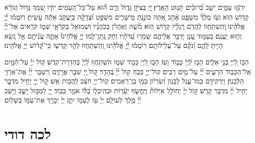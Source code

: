 \documentclass[twoside, openany, parskip=half, 11pt]{book}
\begin{document}
 
 יִרְגְּֿז֣וּ עַמִּ֑ים ישֵׁ֥ב כְּ֝רוּבִ֗ים תָּנ֥וּט הָאָֽרֶץ׃ 
 ֖יְיָ בְּצִיּוֹ֣ן גָּד֑וֹל וְרָ֥ם ה֝֗וּא עַל־כָּל־הָֽעַמִּֽים׃ 
 יוֹד֣וּ שִׁ֭מְךָ גָּד֥וֹל וְנוֹרָ֗א קָד֥וֹשׁ הֽוּא׃ 
 וְעֹ֥ז מֶלֶךְ֘ מִשְׁפָּ֢ט אָ֫הֵ֥ב אַ֭תָּה כּוֹנַ֣נְתָּ מֵּֽישָׁרִ֑ים מִשְׁפָּ֥ט וּ֝צְדָקָ֗ה בְּיַֽעֲקֹ֤ב אַתָּ֬ה עָשִֽׂיתָ׃ 
 רֽוֹמֲמ֡וּ יְ֘יָ֤ אֱלֹהֵ֗ינוּ ֖וְהִֽשְׁתַּֽחֲווּ לַֽהֲדֹ֥ם רַגְלָ֗יו קָד֥וֹשׁ הֽוּא׃ 
 מ֘שֶׁ֤ה וְאַֽהֲרֹ֨ן בְּכֹֽהֲנָ֗יו וּ֭שְׁמוּאֵל בְּקֹֽרְֿאֵ֣י שְׁמ֑וֹ קֹרִ֥אים אֶל־יְ֜יָ֗ וְה֣וּא יַֽעֲנֵֽם׃ 
 בְּעַמּ֣וּד עָ֭נָן יְדַבֵּ֣ר אֲלֵיהֶ֑ם שָֽׁמְֿר֥וּ עֵֽ֝דֹתָ֗יו וְחֹ֣ק נָֽתַן־לָֽמוֹ׃ 
 יְיָ֣ אֱלֹהֵינוּ֘ אַתָּ֢ה עֲנִ֫יתָ֥ם אֵ֣ל נֹ֭שֵֽׂא הָיִ֣יתָ לָהֶ֑ם וְ֝נֹקֵ֗ם עַל־עֲלִֽילוֹתָֽם׃ 
 רֽוֹמֲמ֡וּ יְ֘יָ֤ אֱלֹהֵ֗ינוּ וְ֭הִֽשְׁתַּֽחֲווּ לְהַ֣ר קָדְשׁ֑וֹ כִּֽי־קָ֝ד֗וֹשׁ יְיָ֥ אֱלֹהֵֽינוּ׃

  
 הָב֣וּ לַ֭יְיָ בְּנֵ֣י אֵלִ֑ים הָב֥וּ לַֽ֝יְיָ֗ כָּב֥וֹד וָעֹֽז׃ 
 הָב֣וּ לַ֭יְיָ כְּב֣וֹד שְׁמ֑וֹ הִשְׁתַּֽחֲו֥וּ לַֽ֝יְיָ֗ בְּהַדְרַת־קֹֽדֶשׁ׃ 
 ק֥וֹל יְיָ֗ עַל־הַ֫מָּ֥יִם אֵֽל־הַכָּב֥וֹד הִרְעִ֑ים יְ֜יָ֗ עַל־מַ֥יִם רַבִּֽים׃ 
 קֽוֹל־יְיָ֥ בַּכֹּ֑חַ ק֥וֹל יְ֜יָ֗ בֶּֽהָדָֽר׃ 
 ק֣וֹל ֖יְיָ שֹׁבֵ֣ר אֲרָזִ֑ים וַיְשַׁבֵּ֥ר יְ֜יָ֗ אֶת־אַרְזֵ֥י הַלְּֿבָנֽוֹן׃ 
 וַיַּרְקִידֵ֥ם כְּמוֹ־עֵ֑גֶל לְבָנ֥וֹן וְ֝שִׂרְי֗וֹן כְּמ֣וֹ בֶן־רְאֵמִֽים׃ 
 קֽוֹל־יְיָ֥ חֹצֵ֗ב לַֽהֲב֥וֹת אֵֽשׁ׃ 
 ק֣וֹל יְ֖יָ֥ יָחִ֣יל מִדְבָּ֑ר יָחִ֥יל יְ֜יָ֗ מִדְבַּ֥ר קָדֵֽשׁ׃ 
 ק֣וֹל יְיָ֨ יְחוֹלֵ֣ל אַיָּלוֹת֘ וַיֶּֽחֱשׂ֢ף יְעָ֫ר֥וֹת וּבְהֵֽיכָל֑וֹ כֻּ֝לּ֗וֹ אֹמֵ֥ר כָּבֽוֹד׃ 
 יְ֖יָ לַמַּבּ֣וּל יָשָׁ֑ב וַיֵּ֥שֶׁב יְ֜יָ֗ מֶ֣לֶךְ לְעוֹלָֽם׃ 
יְיָ֗ עֹ֖ז לְעַמּ֣וֹ יִתֵּ֑ן יְיָ֓ יְבָרֵ֖ךְ אֶת־עַמּ֣וֹ בַשָּׁלֽוֹם׃


\section*{ לכה דודי }

\newcommand{\lechadodi}{\textbf{לְכָה דוֹדִי לִקְרַאת כַּלָּה פְּנֵי שַׁבָּת נְקַבְּֿלָה:}}
\end{document}
